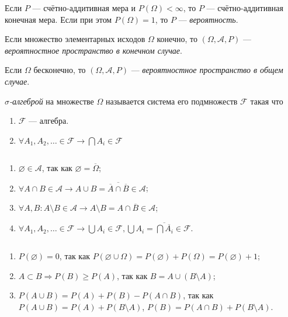 \begin{define*}
  Если $P$ --- счётно-аддитивная мера и $P(\Omega) < \infty$, то $P$ --- счётно-аддитивная конечная мера.
  Если при этом $P(\Omega) = 1$, то $P$ --- \emph{вероятность}.
\end{define*}

\begin{define*}
  Если множество элементарных исходов $\Omega$ конечно, то $(\Omega, \mathcal{A}, P)$ --- \emph{вероятностное пространство в конечном случае}.

  Если $\Omega$ бесконечно, то $(\Omega, \mathcal{A}, P)$ ---  \emph{вероятностное пространство в общем случае}.
\end{define*}

\begin{define*}
  \emph{$\sigma$-алгеброй} на множестве $\Omega$ называется система его подмножеств $\mathcal{F}$ такая что
  \begin{enumerate}
	\item $\mathcal{F} $ --- алгебра.
	\item $\forall	A_1, A_2, \ldots \in \mathcal{F} \to \bigcap A_i \in \mathcal{F}$
  \end{enumerate}
\end{define*}

\begin{remark*} $ $
  \begin{enumerate}
	\item $\varnothing \in \mathcal{A}$, так как $\varnothing = \overline{\Omega}$;
	\item $\forall A \cap B \in \mathcal{A}  \to  A \cup B = \overline{ \overline{A} \cap \overline{B} } \in \mathcal{A}$;
	\item $\forall A, B: A \setminus B \in \mathcal{A} \to A \setminus B = A \cap \overline{B} \in \mathcal{A} $;
	\item $\forall A_1, A_2, \ldots \in \mathcal{F}  \to \bigcup A_i \in \mathcal{F}, \bigcup A_i = \overline{\bigcap\overline{A_i}} \in \mathcal{F}$.
  \end{enumerate}
\end{remark*}

\begin{remark*} $ $
  \begin{enumerate}
	\item $P(\varnothing) = 0$, так как $P(\varnothing \cup \Omega) = P(\varnothing) + P(\Omega) = P(\varnothing) + 1$;
	\item $A \subset B \Rightarrow P(B) \ge P(A)$, так как $B = A \cup (B\setminus A)$;
	\item $P(A \cup B) = P(A) + P(B) - P(A \cap B)$, так как $P(A\cup B) = P(A) + P(B\setminus A)$, $P(B) = P(A \cap B) + P(B \setminus A)$.
  \end{enumerate}
\end{remark*}

